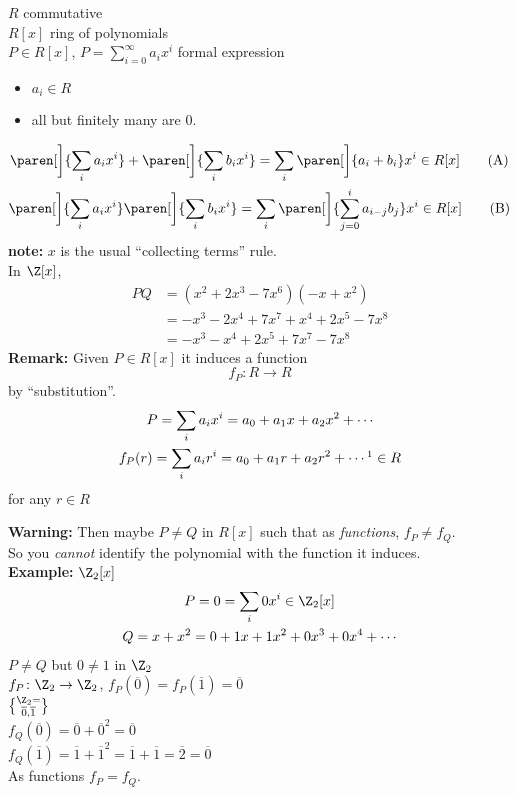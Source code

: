 $R$ commutative \\
$R[x]$ ring of polynomials \\
$P\in R[x]$, $P=\sum_{i=0}^\infty a_i x^i$ formal expression
\begin{itemize}
\item $a_i\in R$
\item all but finitely many are $0$.
\end{itemize}
\begin{gather*}
\paren[\bigg]{\sum_i a_i x^i} + \paren[\bigg]{\sum_i b_i x^i} = \sum_i \paren[\bigg]{a_i+b_i} x^i \in R[x] \tag{A}\label{eqA} \\
\paren[\bigg]{\sum_i a_i x^i}\paren[\bigg]{\sum_i b_i x^i} = \sum_i \paren[\bigg]{\sum_{j=0}^i a_{i-j}b_j} x^i \in R[x] \tag{B}\label{eqB}
\end{gather*}
\textbf{note:} $x$ is the usual ``collecting terms'' rule. \\
In $\Z[x]$,
\begin{align*}
PQ &= (x^2+2x^3-7x^6)(-x+x^2) \\
&= -x^3 -2x^4 + 7x^7 + x^4 + 2x^5 - 7x^8 \\
&= -x^3 - x^4 + 2x^5 + 7x^7 - 7x^8
\end{align*}
\textbf{Remark:} Given $P\in R[x]$ it induces a function
\[ f_P\colon R \to R \]
by ``substitution''.
\begin{gather*}
P = \sum_i a_i x^i = a_0 + a_1x + a_2x^2 + \dotsb \\
f_P(r) = \sum_i a_i r^i = a_0 + a_1r + a_2r^2 + \dotsb\footnotemark \in R
\end{gather*}%
for any $r\in R$

\textbf{Warning:} Then maybe $P\neq Q$ in $R[x]$ such that as \emph{functions}, $f_P\neq f_Q$. \\
So you \emph{cannot} identify the polynomial with the function it induces. \\
\textbf{Example:} $\Z_2[x]$ \\
\begin{gather*}
P = 0 = \sum_i 0x^i \in \Z_2[x] \\
Q = x + x^2 = 0 + 1x + 1x^2 + 0x^3 + 0x^4 + \dotsb
\end{gather*}
$P\neq Q$ but $0\neq1$ in $\Z_2$ \\
$f_P\colon\Z_2\to\Z_2$, $f_P(\overline0)=f_P(\overline1)=\overline0$ \\
$\Z_2 = \brace{\overline0,\overline1}$ \\
$f_Q(\overline0)=\overline0+\overline0^2=\overline0$ \\
$f_Q(\overline1)=\overline1+\overline1^2=\overline1+\overline1=\overline2=\overline0$ \\
As functions $f_P=f_Q$.

